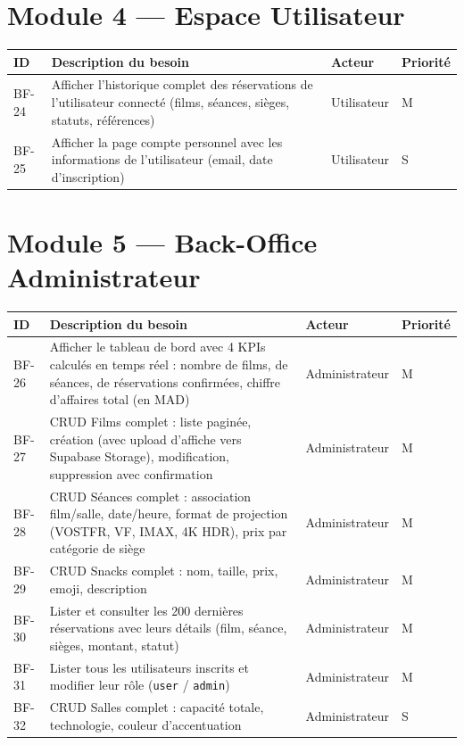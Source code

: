 \documentclass[12pt,a4paper,openany]{report}
\begin{document}
\section{Module 4 — Espace Utilisateur}

\begin{longtable}{p{1cm}p{6.5cm}lp{3.5cm}}
  \toprule
  \textbf{ID} & \textbf{Description du besoin} & \textbf{Acteur} & \textbf{Priorité} \\
  \midrule
  \endhead
  \bottomrule
  \endfoot

  BF-24 & Afficher l'historique complet des réservations de l'utilisateur connecté (films, séances, sièges, statuts, références) & Utilisateur & M \\[4pt]

  BF-25 & Afficher la page compte personnel avec les informations de l'utilisateur (email, date d'inscription) & Utilisateur & S \\
\end{longtable}

\section{Module 5 — Back-Office Administrateur}

\begin{longtable}{p{1cm}p{6.5cm}lp{3.5cm}}
  \toprule
  \textbf{ID} & \textbf{Description du besoin} & \textbf{Acteur} & \textbf{Priorité} \\
  \midrule
  \endhead
  \bottomrule
  \endfoot

  BF-26 & Afficher le tableau de bord avec 4 KPIs calculés en temps réel : nombre de films, de séances, de réservations confirmées, chiffre d'affaires total (en MAD) & Administrateur & M \\[4pt]

  BF-27 & CRUD Films complet : liste paginée, création (avec upload d'affiche vers Supabase Storage), modification, suppression avec confirmation & Administrateur & M \\[4pt]

  BF-28 & CRUD Séances complet : association film/salle, date/heure, format de projection (VOSTFR, VF, IMAX, 4K HDR), prix par catégorie de siège & Administrateur & M \\[4pt]

  BF-29 & CRUD Snacks complet : nom, taille, prix, emoji, description & Administrateur & M \\[4pt]

  BF-30 & Lister et consulter les 200 dernières réservations avec leurs détails (film, séance, sièges, montant, statut) & Administrateur & M \\[4pt]

  BF-31 & Lister tous les utilisateurs inscrits et modifier leur rôle (\texttt{user} / \texttt{admin}) & Administrateur & M \\[4pt]

  BF-32 & CRUD Salles complet : capacité totale, technologie, couleur d'accentuation & Administrateur & S \\
\end{longtable}
\end{document}
